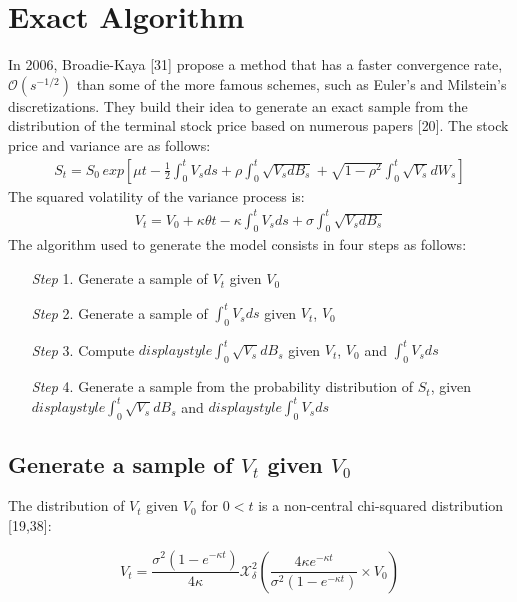 \documentclass[12pt,twoside]{reedthesis}
\theoremstyle{definition}
\theoremstyle{definition}
\theoremstyle{remark}
\begin{document}
  \section{Exact Algorithm}\label{exact-algorithm}
  
  In 2006, Broadie-Kaya {[}31{]} propose a method that has a faster
  convergence rate, \(\mathcal{O} \left( s^{-1/2} \right)\) than some of
  the more famous schemes, such as Euler's and Milstein's discretizations.
  They build their idea to generate an exact sample from the distribution
  of the terminal stock price based on numerous papers {[}20{]}. The stock
  price and variance are as follows:
  \begin{align} \label{eq:ea1}
  S_t = S_0 \, exp \left[ \mu t - \frac{1}{2} \int_{0}^{t}{V_s ds} + \rho  \int_{0}^{t}{\sqrt{V_s d B_s}} + \sqrt{1 - \rho^2} \int_{0}^{t}{\sqrt{V_s} dW_s}\right]
  \end{align}
  The squared volatility of the variance process is:
  \begin{align} \label{eq:ea2}
  V_t = V_0 + \kappa \theta t - \kappa \int_{0}^{t}{V_s ds} + \sigma \int_{0}^{t}{\sqrt{V_s dB_s}}
  \end{align}
  The algorithm used to generate the model consists in four steps as
  follows:
  \begin{itemize}
  \item [\textit{Step} 1.] Generate a sample of $V_t$ given $V_0$
  \item [\textit{Step} 2.] Generate a sample of $\displaystyle \int_0^t V_sds$ given $V_t$, $V_0$
  \item [\textit{Step} 3.] Compute $displaystyle \int_0^t \sqrt{V_s}dB_s$ given $V_t$, $V_0$ and $\int_0^t V_sds$
  \item [\textit{Step} 4.] Generate a sample from the probability distribution of $S_t$, given $displaystyle \int_0^t \sqrt{V_s}dB_s$ and $displaystyle \int_0^t V_sds$
  \end{itemize}
  \subsection{\texorpdfstring{Generate a sample of \(V_t\) given
  \(V_0\)}{Generate a sample of V\_t given V\_0}}\label{generate-a-sample-of-v_t-given-v_0}
  
  The distribution of \(V_t\) given \(V_0\) for \(0 < t\) is a non-central
  chi-squared distribution {[}19,38{]}:
  
  \[V_t = \frac{\sigma^2 (1-e^{- \kappa t})}{4 \kappa} \mathcal{X}_{\delta}^{2} \left( \frac{4 \kappa e^{- \kappa t}}{\sigma^2 (1- e^{- \kappa t})} \times V_0\right)\]
  
\end{document}
